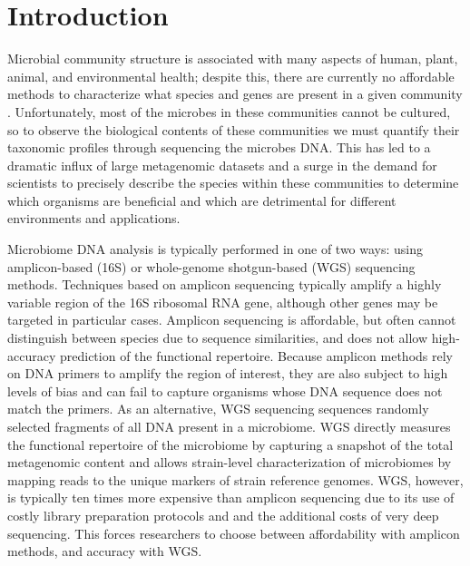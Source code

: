 \section{Introduction}

Microbial community structure is associated with many aspects of human, plant, animal, and environmental health; despite this, there are currently no affordable methods to characterize what species and genes are present in a given community \cite{prifti_new_2013}. Unfortunately, most of the microbes in these communities cannot be cultured, so to observe the biological contents of these communities we must quantify their taxonomic profiles through sequencing the microbes DNA. This has led to a dramatic influx of large metagenomic datasets and a surge in the demand for scientists to precisely describe the species within these communities to determine which organisms are beneficial and which are detrimental for different environments and applications.

Microbiome DNA analysis is typically performed in one of two ways: using amplicon-based (16S) or whole-genome shotgun-based (WGS) sequencing methods. Techniques based on amplicon sequencing typically amplify a highly variable region of the 16S ribosomal RNA gene, although other genes may be targeted in particular cases. Amplicon sequencing is affordable, but often cannot distinguish between species due to sequence similarities, and does not allow high-accuracy prediction of the functional repertoire. Because amplicon methods rely on DNA primers to amplify the region of interest, they are also subject to high levels of bias and can fail to capture organisms whose DNA sequence does not match the primers. As an alternative, WGS sequencing sequences randomly selected fragments of all DNA present in a microbiome. WGS directly measures the functional repertoire of the microbiome by capturing a snapshot of the total metagenomic content and allows strain-level characterization of microbiomes by mapping reads to the unique markers of strain reference genomes. WGS, however, is typically ten times more expensive than amplicon sequencing due to its use of costly library preparation protocols and and the additional costs of very deep sequencing. This forces researchers to choose between affordability with amplicon methods, and accuracy with WGS.

